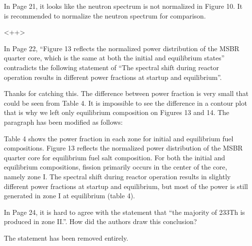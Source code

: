 \documentclass[answers,11pt]{exam}
\begin{document}
\begin{questions}
        \question  In Page 21, it looks like the neutron spectrum is not 
        normalized in Figure 10. It is recommended to normalize the neutron 
        spectrum for comparison.
        \begin{solution}
                <++>
        \end{solution}

        \question  In Page 22, ``Figure 13 reflects the normalized power 
        distribution of the MSBR quarter core, which is the same at both the 
        initial and equilibrium states'' contradicts the following statement of 
        ``The spectral shift during reactor operation results in different power 
        fractions at startup and equilibrium''.
        \begin{solution}
                Thanks for catching this. The difference between power fraction
                 is very small that could be seen from Table 4. It is impossible
                  to see the difference in a contour plot that is why we left only 
                 equilibrium composition on Figures 13 and 14. The paragraph has 
                 been modified as follows:
                 
                 Table 4 shows the power fraction in each zone for initial and 
                 equilibrium fuel compositions. Figure 13 reflects the normalized 
                 power distribution of the MSBR quarter core for equilibrium 
                 fuel salt composition. For both the initial and equilibrium 
                 compositions, fission primarily occurs in the center of the core, 
                 namely zone I. The spectral shift during reactor operation results 
                 in slightly different power fractions at startup and equilibrium, 
                 but most of the power is still generated in zone I at equilibrium 
				 (table 4).                  
                   
        \end{solution}

        \question  In Page 24, it is hard to agree with the statement that ``the 
        majority of 233Th is produced in zone II.''. How did the authors draw 
        this conclusion?
        \begin{solution}
                The statement has been removed entirely.
        \end{solution}


\end{questions}
\end{document}
